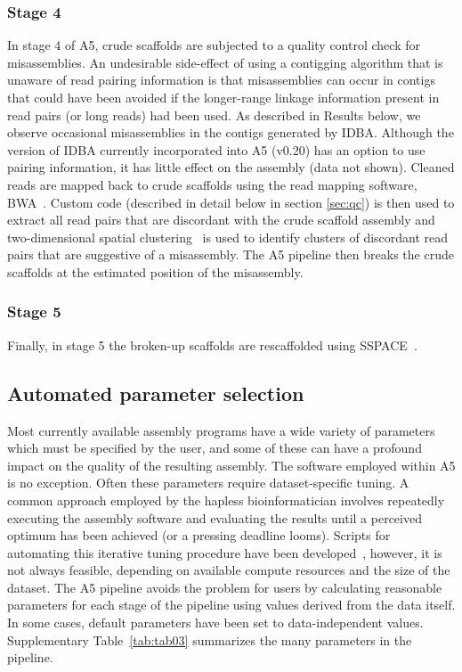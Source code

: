 \documentclass[10pt]{article}
\begin{document}
\subsubsection*{Stage 4}
In stage 4 of A5, crude 
scaffolds are subjected to a quality control check for misassemblies. 
An undesirable side-effect of using a contigging algorithm that is unaware of read pairing information is that misassemblies can occur in contigs 
that could have been avoided if the longer-range linkage information present in read pairs (or long reads) had been used.  As described in Results 
below, we observe occasional misassemblies in the contigs generated by IDBA. Although the version of IDBA currently incorporated into A5 (v0.20) has
an option to use pairing information, it has little effect on the assembly (data not shown). 
Cleaned reads are mapped back to crude scaffolds using the read mapping software,
BWA~\cite{bwa}. Custom code (described in detail below in section \ref{sec:qc}) is then used to extract all read pairs that are discordant with the 
crude scaffold assembly and two-dimensional spatial clustering~\cite{DBSCAN} is used to identify clusters of discordant read pairs that are 
suggestive of a misassembly. The A5 pipeline then breaks the crude scaffolds at the estimated position of the misassembly.

\subsubsection*{Stage 5}
Finally, in stage 5 the broken-up scaffolds are rescaffolded using SSPACE~\cite{Boetzer2011}.

\subsection*{Automated parameter selection}

Most currently available assembly programs have a wide variety of parameters which must
be specified by the user, and some of these can have a profound impact on the quality of the 
resulting assembly. The software employed within A5 is no exception. 
Often these parameters require dataset-specific tuning.  A common approach
employed by the hapless bioinformatician involves repeatedly
executing the assembly software and evaluating the results until a perceived 
optimum has been achieved (or a pressing deadline looms). Scripts for automating this iterative tuning procedure have 
been developed~\cite{VelvetOpt}, however, it is not always feasible, depending on available compute resources and the size 
of the dataset. The A5 pipeline avoids the problem for users by calculating reasonable
parameters for each stage of the pipeline using values derived from the data itself. In some
cases, default parameters have been set to data-independent values. Supplementary Table~\ref{tab:tab03} 
summarizes the many parameters in the pipeline.
\end{document}
